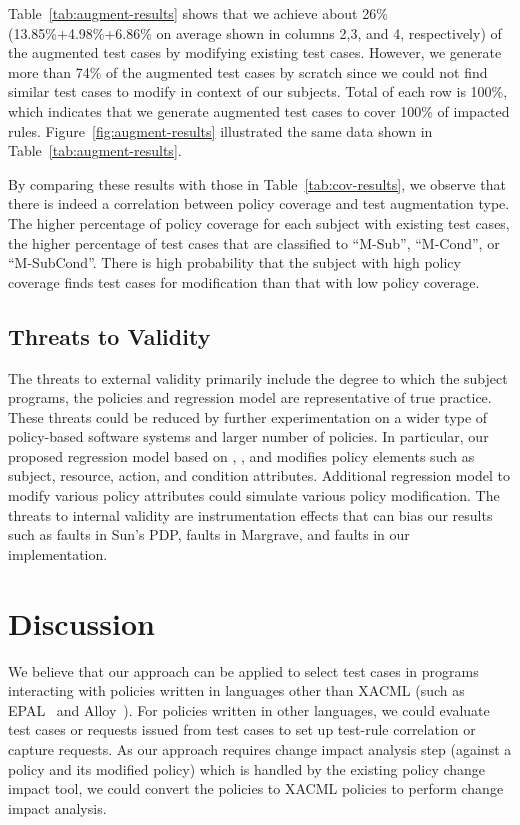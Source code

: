Table~\ref{tab:augment-results} shows that we achieve
about 26\% (13.85\%+4.98\%+6.86\% on average shown in columns 2,3, and 4, respectively) of the augmented test cases by modifying existing test
cases. However, we generate more than 74\% of the augmented test cases by scratch since we could not find similar
test cases to modify in context of our subjects. Total of each row is 100\%, which indicates that we
generate  augmented test cases to cover 100\% of impacted rules.
Figure~\ref{fig:augment-results} illustrated
the same data shown in Table~\ref{tab:augment-results}.

By comparing these results with those in Table~\ref{tab:cov-results}, we observe that there is indeed a correlation between policy coverage and 
test augmentation type.
The higher percentage of policy coverage for each subject with existing test cases,
the higher percentage of test cases that
are classified to ``M-Sub'', ``M-Cond'', or ``M-SubCond''.
There is high probability that the subject with high policy coverage
finds test cases  for modification than that with low policy coverage.

%

\subsection{Threats to Validity}
The threats to external validity primarily include the degree to
which the subject programs, the policies and regression model are representative of true practice.
These threats
could be reduced by further experimentation on a wider type of policy-based software systems and
larger number of policies.
In particular, our proposed regression model based on , ,
and  modifies policy elements such as subject, resource, action, and condition attributes. 
Additional regression model to modify various policy attributes could simulate various policy modification.
The threats to internal validity are instrumentation effects
that can bias our results such as faults in Sun's PDP, faults in Margrave, and
faults in our implementation.


\section{Discussion}\label{sec:discussion}
We believe that our approach can be applied to select test cases in programs interacting
with policies written in languages other than XACML (such as EPAL~\cite{epal} and Alloy~\cite{jackson01:micromodularity}). 
For policies written in other languages, we could evaluate test cases or requests issued from test cases to set up test-rule correlation or capture requests. 
As our approach requires change impact analysis step (against a policy and its modified policy) which is handled by 
the existing policy change impact tool, we could convert the policies to XACML policies to perform change impact analysis.



